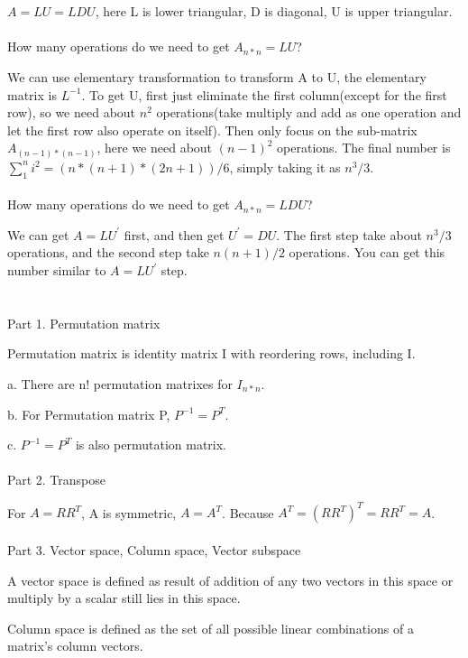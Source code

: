 \documentclass{article}
\begin{document}
\begin{spacing}{1.5}
\section{}
$A = LU = LDU$, here L is lower triangular, D is diagonal, U is upper triangular. \\
\\ How many operations do we need to get $A_{n*n}=LU$?

We can use elementary transformation to transform A to U, the elementary matrix is $L^{-1}$. To get U, first just eliminate the first column(except for the first row), so we need about $n^2$ operations(take multiply and add as one operation and let the first row also operate on itself). Then only focus on the sub-matrix $A_{(n-1)*(n-1)}$, here we need about $(n-1)^2$ operations. The final number is $\sum_{1}^{n} i^2 = (n * (n + 1) * (2n + 1)) / 6$, simply taking it as $n^3/3$. \\
\\ How many operations do we need to get $A_{n*n}=LDU$?

We can get $A=LU^{'}$ first, and then get $U^{'}=DU$. The first step take about $n^3/3$ operations, and the second step take $n(n+1)/2$ operations. You can get this number similar to $A=LU^{'}$ step.


\section{}
Part 1. Permutation matrix

Permutation matrix is identity matrix I with reordering rows, including I.

a. There are n! permutation matrixes for $I_{n*n}$.

b. For Permutation matrix P, $P^{-1}=P^{T}$.

c. $P^{-1}=P^{T}$ is also permutation matrix.
\\\\ Part 2. Transpose

For $A=RR^T$, A is symmetric, $A=A^T$. Because $A^T=(RR^T)^T=RR^T=A$.
\\\\ Part 3. Vector space, Column space, Vector subspace

A vector space is defined as result of addition of any two vectors in this space or multiply by a scalar still lies in this space.

Column space is defined as the set of all possible linear combinations of a matrix's column vectors.


\end{spacing}
\end{document}
